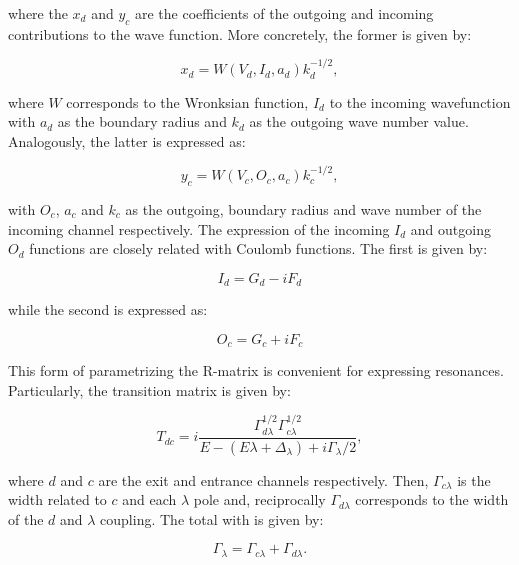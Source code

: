 \documentclass[openany]{book}
\begin{document}
where the $x_d$ and $y_c$ are the coefficients of the outgoing and incoming contributions to the wave function. More concretely, the former is given by:

\begin{equation}\label{eq:rmatrix_kmatrix_Smatrix_x}
	x_d = W(V_d, I_d, a_d) k^{-1/2}_d,
\end{equation}

where $W$ corresponds to the Wronksian function, $I_d$ to the incoming wavefunction  with $a_d$ as the boundary radius and $k_d$ as the outgoing wave number value. Analogously, the latter is expressed as: 

\begin{equation}\label{eq:rmatrix_kmatrix_Smatrix_y}
	y_c = W(V_c, O_c, a_c) k^{-1/2}_c,
\end{equation}

with $O_c$, $a_c$ and $k_c$ as the outgoing, boundary radius and wave number of the incoming channel respectively. The expression of the incoming $I_d$ and outgoing $O_d$ functions are closely related with Coulomb functions. The first is given by:

\begin{equation}\label{eq:rmatrix_kmatrix_Smatrix_ingoing}
	I_d = G_d - i F_d
\end{equation}

while the second is expressed as:

\begin{equation}\label{eq:rmatrix_kmatrix_Smatrix_outgoing}
	O_c = G_c + iF_c
\end{equation}


This form of parametrizing the R-matrix is convenient for expressing resonances. Particularly, the transition matrix is given by:

\begin{equation}\label{eq:rmatrix_kmatrix_transitionMatrix}
	T_{dc} = i \frac{\Gamma^{1/2}_{d\lambda} \Gamma^{1/2}_{c\lambda} }{E - (E\lambda + \Delta_\lambda) + i \Gamma_\lambda/2},
\end{equation}

where $d$ and $c$ are the exit and entrance channels respectively. Then, $\Gamma_{c\lambda}$ is the width related to $c$ and each $\lambda$ pole and, reciprocally $\Gamma_{d\lambda}$ corresponds to the width of the $d$ and $\lambda$ coupling. The total with is given by:

\begin{equation}\label{eq:rmatrix_kmatrix_totalWidth}
	\Gamma_\lambda = \Gamma_{c\lambda} + \Gamma_{d\lambda}.
\end{equation}
\end{document}

